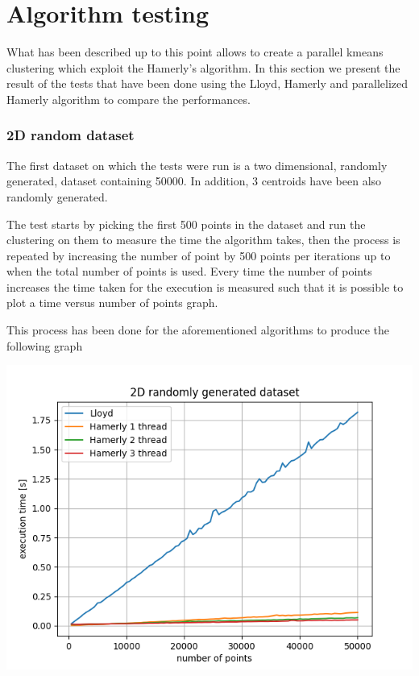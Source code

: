 \documentclass{report}
\begin{document}
\begin{minipage}[b]{0.48\textwidth}
  \section*{Algorithm testing}
  What has been described up to this point allows to create a parallel kmeans clustering which exploit the Hamerly's algorithm. In this section we present the result of the tests that have been done using the Lloyd, Hamerly and parallelized Hamerly algorithm to compare the performances.

  \subsubsection*{2D random dataset}
  The first dataset on which the tests were run is a two dimensional, randomly generated, dataset containing 50000. In addition, 3 centroids have been also randomly generated. 
  
  The test starts by picking the first 500 points in the dataset and run the clustering on them to measure the time the algorithm takes, then the process is repeated by increasing the number of point by 500 points per iterations up to when the total number of points is used. Every time the number of points increases the time taken for the execution is measured such that it is possible to plot a time versus number of points graph.

  This process has been done for the aforementioned algorithms to produce the following graph
  
  \begin{center} 
    \includegraphics[width = 1\textwidth]{imgs/lh123_2Drnd.png}
    \label{fig:lh123_2Drnd}
  \end{center}


\end{minipage}
\end{document}
